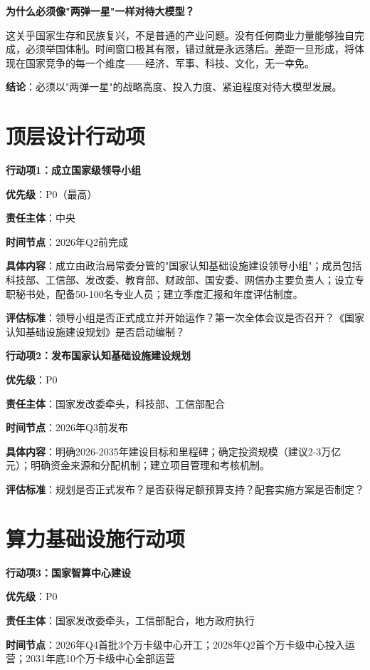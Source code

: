 \textbf{为什么必须像"两弹一星"一样对待大模型？}

这关乎国家生存和民族复兴，不是普通的产业问题。没有任何商业力量能够独自完成，必须举国体制。时间窗口极其有限，错过就是永远落后。差距一旦形成，将体现在国家竞争的每一个维度——经济、军事、科技、文化，无一幸免。

\textbf{结论}：必须以"两弹一星"的战略高度、投入力度、紧迫程度对待大模型发展。

\section{顶层设计行动项}

\textbf{行动项1：成立国家级领导小组}

\textbf{优先级}：P0（最高）

\textbf{责任主体}：中央

\textbf{时间节点}：2026年Q2前完成

\textbf{具体内容}：成立由政治局常委分管的"国家认知基础设施建设领导小组"；成员包括科技部、工信部、发改委、教育部、财政部、国安委、网信办主要负责人；设立专职秘书处，配备50-100名专业人员；建立季度汇报和年度评估制度。

\textbf{评估标准}：领导小组是否正式成立并开始运作？第一次全体会议是否召开？《国家认知基础设施建设规划》是否启动编制？

\textbf{行动项2：发布国家认知基础设施建设规划}

\textbf{优先级}：P0

\textbf{责任主体}：国家发改委牵头，科技部、工信部配合

\textbf{时间节点}：2026年Q3前发布

\textbf{具体内容}：明确2026-2035年建设目标和里程碑；确定投资规模（建议2-3万亿元）；明确资金来源和分配机制；建立项目管理和考核机制。

\textbf{评估标准}：规划是否正式发布？是否获得足额预算支持？配套实施方案是否制定？

\section{算力基础设施行动项}

\textbf{行动项3：国家智算中心建设}

\textbf{优先级}：P0

\textbf{责任主体}：国家发改委牵头，工信部配合，地方政府执行

\textbf{时间节点}：2026年Q4首批3个万卡级中心开工；2028年Q2首个万卡级中心投入运营；2031年底10个万卡级中心全部运营

